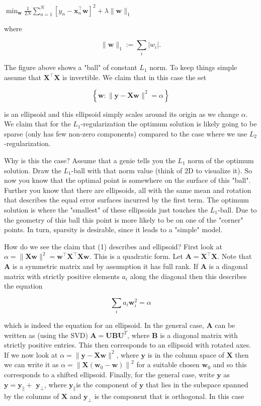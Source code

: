 $\min _{\mathbf{w}} \frac{1}{2 N} \sum_{n=1}^{N}\left[y_{n}-\mathbf{x}_{n}^{\top} \mathbf{w}\right]^{2}+\lambda\|\mathbf{w}\|_{1}$

where

$$
\|\mathbf{w}\|_{1}:=\sum_{i}\left|w_{i}\right| .
$$


The figure above shows a "ball" of constant $L_{1}$ norm. To keep things simple assume that $\mathbf{X}^{\top} \mathbf{X}$ is invertible. We claim that in this case the set

$$
\left\{\mathbf{w}:\|\mathbf{y}-\mathbf{X} \mathbf{w}\|^{2}=\alpha\right\}
$$

is an ellipsoid and this ellipsoid simply scales around its origin as we change $\alpha$. We claim that for the $L_{1}$-regularization the optimum solution is likely going to be sparse (only has few non-zero components) compared to the case where we use $L_{2}$-regularization.

Why is this the case? Assume that a genie tells you the $L_{1}$ norm of the optimum solution. Draw the $L_{1}$-ball with that norm value (think of $2 \mathrm{D}$ to visualize it). So now you know that the optimal point is somewhere on the surface of this "ball". Further you know that there are ellipsoids, all with the same mean and rotation that describes the equal error surfaces incurred by the first term. The optimum solution is where the "smallest" of these ellipsoids just touches the $L_{1}$-ball. Due to the geometry of this ball this point is more likely to be on one of the "corner" points. In turn, sparsity is desirable, since it leads to a "simple" model.

How do we see the claim that (1) describes and ellipsoid? First look at $\alpha=\|\mathbf{X w}\|^{2}=\mathbf{w}^{\top} \mathbf{X}^{\top} \mathbf{X w}$. This is a quadratic form. Let $\mathbf{A}=\mathbf{X}^{\top} \mathbf{X}$. Note that $\mathbf{A}$ is a symmetric matrix and by assumption it has full rank. If $\mathbf{A}$ is a diagonal matrix with strictly positive elements $a_{i}$ along the diagonal then this describes the equation

$$
\sum_{i} a_{i} \mathbf{w}_{i}^{2}=\alpha
$$

which is indeed the equation for an ellipsoid. In the general case, $\mathbf{A}$ can be written as (using the SVD) $\mathbf{A}=\mathbf{U B U}^{T}$, where $\mathbf{B}$ is a diagonal matrix with strictly positive entries. This then corresponds to an ellipsoid with rotated axes. If we now look at $\alpha=\|\mathbf{y}-\mathbf{X} \mathbf{w}\|^{2}$, where $\mathbf{y}$ is in the column space of $\mathbf{X}$ then we can write it as $\alpha=\left\|\mathbf{X}\left(\mathbf{w}_{0}-\mathbf{w}\right)\right\|^{2}$ for a suitable chosen $\mathbf{w}_{0}$ and so this corresponds to a shifted ellipsoid. Finally, for the general case, write $\mathbf{y}$ as $\mathbf{y}=\mathbf{y}_{\|}+$ $\mathbf{y}_{\perp}$, where $\mathbf{y}_{\|}$is the component of $\mathbf{y}$ that lies in the subspace spanned by the columns of $\mathbf{X}$ and $\mathbf{y}_{\perp}$ is the component that
is orthogonal. In this case

